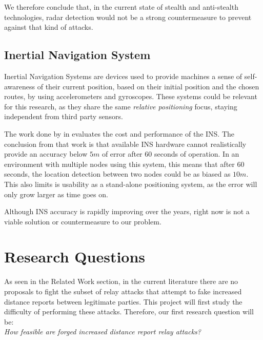 \documentclass{article}
\begin{document}
We therefore conclude that, in the current state of stealth and anti-stealth technologies, radar detection would not be a strong countermeasure to prevent against that kind of attacks.



\subsection{Inertial Navigation System}

Inertial Navigation Systems are devices used to provide machines a sense of self-awareness of their current position, based on their initial position and the chosen routes, by using accelerometers and gyroscopes. These systems could be relevant for this research, as they share the same \emph{relative positioning} focus, staying independent from third party sensors.

The work done by \citeauthor{woodman2007introduction} in \cite{woodman2007introduction} evaluates the cost and performance of the INS. The conclusion from that work is that available INS hardware cannot realistically provide an accuracy below $5m$ of error after $60$ seconds of operation. In an environment with multiple nodes using this system, this means that after $60$ seconds, the location detection between two nodes could be as biased as $10m$. This also limits is usability as a stand-alone positioning system, as the error will only grow larger as time goes on.

Although INS accuracy is rapidly improving over the years, right now is not a viable solution or countermeasure to our problem.







\section{Research Questions}
\label{sec:researchquestions}

As seen in the Related Work section, in the current literature there are no proposals to fight the subset of relay attacks that attempt to fake increased distance reports between legitimate parties. This project will first study the difficulty of performing these attacks. Therefore, our first research question will be:\\

\emph{How feasible are forged increased distance report relay attacks?}\\
\end{document}
